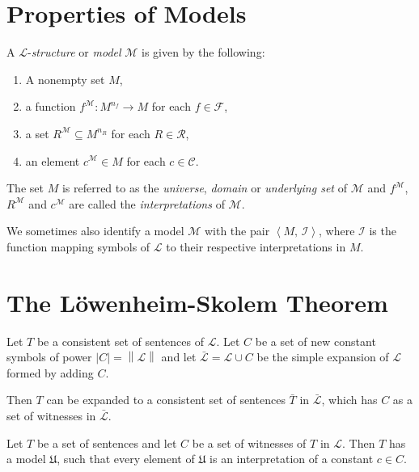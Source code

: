 \documentclass[../../main.tex]{subfiles}
\begin{document}
\section{Properties of Models}
\begin{definition}
    A $\mathcal{L}$-\textit{structure} or \textit{model} $\mathcal{M}$ is given by the following:
    \begin{enumerate}
        \item A nonempty set $M$,
        \item a function $f^{\mathcal{M}}: M^{n_f} \to M$ for each $f \in \mathcal{F}$,
        \item a set $R^\mathcal{M} \subseteq M^{n_R}$ for each $R \in \mathcal{R}$,
        \item an element $c^\mathcal{M} \in M$ for each $c \in \mathcal{C}$.
    \end{enumerate}
    The set $M$ is referred to as the \textit{universe}, \textit{domain} or \textit{underlying set} of $\mathcal{M}$ 
    and $f^{\mathcal{M}}$, $R^{\mathcal{M}}$ and $c^{\mathcal{M}}$ are called the \textit{interpretations} of $\mathcal{M}$. \cite[Definition 1.1.2]{Mar02}

    We sometimes also identify a model $\mathcal{M}$ with the pair $\left<M,\, \mathcal{I}\right>$, 
    where $\mathcal{I}$ is the function mapping symbols of $\mathcal{L}$ to their respective interpretations in $M$. \cite[p.20]{Cha90}
\end{definition}

\section{The Löwenheim-Skolem Theorem}

\begin{lemma}\cite[Lemma 2.1.1]{Cha90}
    Let $T$ be a consistent set of sentences of $\mathcal{L}$.  
    Let $C$ be a set of new constant symbols of power $\left\lvert C \right\rvert = \left\lVert \mathcal{L} \right\rVert$
     and let $\bar{\mathcal{L}} = \mathcal{L} \cup C$ be the simple expansion of $\mathcal{L}$ formed by adding $C$.
    
    Then $T$ can be expanded to a consistent set of sentences $\bar{T}$ in $\bar{\mathcal{L}}$, which has $C$ as a set of witnesses in $\bar{\mathcal{L}}$.
\end{lemma}

\begin{lemma}\cite[Lemma 2.1.2]{Cha90}
    Let $T$ be a set of sentences and let $C$ be a set of witnesses of $T$ in $\mathcal{L}$.
    Then $T$ has a model $\mathfrak{U}$, such that every element of $\mathfrak{U}$ is an interpretation of a constant $c \in C$.
\end{lemma} 
\end{document}
